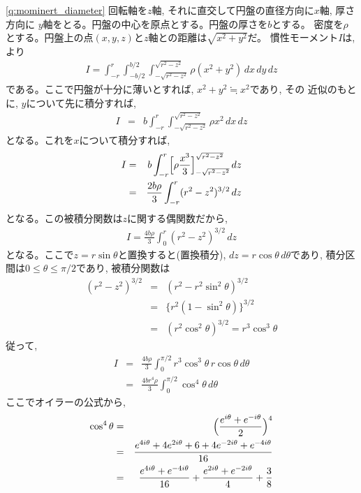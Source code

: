 \begin{q}
\ref{q:mominert_diameter}
回転軸を$z$軸, それに直交して円盤の直径方向に$x$軸, 厚さ方向に
$y$軸をとる。円盤の中心を原点とする。円盤の厚さを$b$とする。
密度を$\rho$とする。円盤上の点$(x, y, z)$と$z$軸との距離は$\sqrt{x^2+y^2}$だ。
慣性モーメント$I$は, より
\begin{eqnarray*}
I=\int_{-r}^{r}\int_{-b/2}^{b/2}\int_{-\sqrt{r^2-z^2}}^{\sqrt{r^2-z^2}}\rho(x^2+y^2)\,dx\,dy\,dz
\end{eqnarray*}
である。ここで円盤が十分に薄いとすれば, $x^2+y^2\fallingdotseq x^2$であり, その
近似のもとに, $y$について先に積分すれば, 
\begin{eqnarray}
I&=&b\int_{-r}^{r}\int_{-\sqrt{r^2-z^2}}^{\sqrt{r^2-z^2}}\rho x^2\,dx\,dz
\end{eqnarray}
となる。これを$x$について積分すれば, 
\begin{eqnarray}
I&=&b\int_{-r}^{r}\Bigl[\rho\frac{x^3}{3}\Bigr]_{-\sqrt{r^2-z^2}}^{\sqrt{r^2-z^2}}\,dz\nonumber\\
 &=&\frac{2b\rho}{3}\int_{-r}^{r}(r^2-z^2)^{3/2}\,dz
\end{eqnarray}
となる。この被積分関数は$z$に関する偶関数だから, 
\begin{eqnarray}
I=\frac{4b\rho}{3}\int_{0}^{r}(r^2-z^2)^{3/2}\,dz
\end{eqnarray}
となる。ここで$z=r\sin\theta$と置換すると(置換積分), 
$dz=r\cos\theta\,d\theta$であり, 積分区間は$0\leq\theta\leq\pi/2$であり, 
被積分関数は
\begin{eqnarray*}
(r^2-z^2)^{3/2}&=&(r^2-r^2\sin^2\theta)^{3/2}\\
               &=&\{r^2(1-\sin^2\theta)\}^{3/2}\\
               &=&(r^2\cos^2\theta)^{3/2}=r^3\cos^3\theta
\end{eqnarray*}
従って, 
\begin{eqnarray}
I&=&\frac{4b\rho}{3}\int_{0}^{\pi/2}r^3\cos^3\theta\,r\cos\theta\,d\theta\nonumber\\
 &=&\frac{4br^4\rho}{3}\int_{0}^{\pi/2}\cos^4\theta\,d\theta
\end{eqnarray}
ここでオイラーの公式から, 
\begin{eqnarray}
\cos^4\theta&=&\Bigl(\frac{e^{i\theta}+e^{-i\theta}}{2}\Bigr)^4\nonumber\\
             &=&\frac{e^{4i\theta}+4e^{2i\theta}+6+4e^{-2i\theta}+e^{-4i\theta}}{16}\nonumber\\
             &=&\frac{e^{4i\theta}+e^{-4i\theta}}{16}+\frac{e^{2i\theta}+e^{-2i\theta}}{4}+\frac{3}{8}\nonumber\\

\end{eqnarray}
\end{q}

